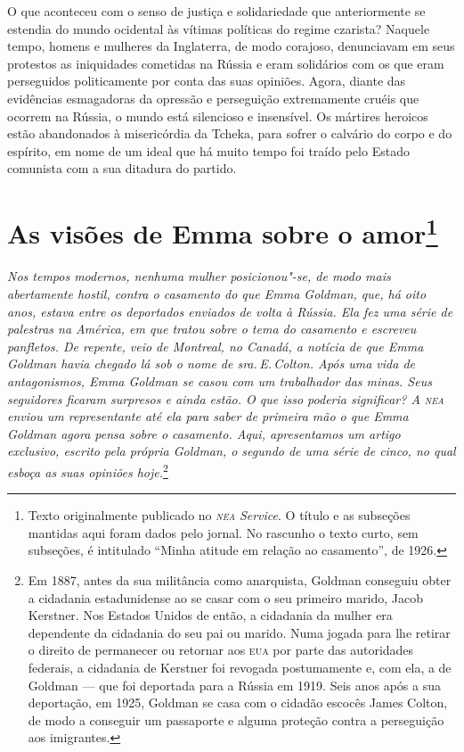 O que aconteceu com o senso de justiça e solidariedade que
anteriormente se estendia do mundo ocidental às vítimas políticas do
regime czarista? Naquele tempo, homens e mulheres da Inglaterra, de modo
corajoso, denunciavam em seus protestos as iniquidades cometidas na
Rússia e eram solidários com os que eram perseguidos politicamente por
conta das suas opiniões. Agora, diante das evidências esmagadoras da
opressão e perseguição extremamente cruéis que ocorrem na Rússia, o
mundo está silencioso e insensível. Os mártires heroicos estão
abandonados à misericórdia da Tcheka, para sofrer o calvário do corpo e
do espírito, em nome de um ideal que há muito tempo foi traído pelo
Estado comunista com a sua ditadura do partido.

\chapter{As visões de Emma sobre o amor\footnote{Texto originalmente publicado no
  \textit{\textsc{nea} Service}. O título e as subseções mantidas
  aqui foram dados pelo jornal. No rascunho o texto curto, sem
  subseções, é intitulado ``Minha atitude em relação ao casamento'', de 1926.}}


\textit{Nos tempos modernos, nenhuma mulher posicionou"-se, de
modo mais abertamente hostil, contra o casamento do que Emma Goldman,
que, há oito anos, estava entre os deportados enviados de volta à
Rússia. Ela fez uma série de palestras na América, em que tratou sobre o
tema do casamento e escreveu panfletos. De repente, veio de Montreal, no Canadá, a notícia de que Emma Goldman havia chegado lá sob o nome de
sra.\,E.\,Colton. Após uma vida de antagonismos, Emma Goldman se casou com
um trabalhador das minas. Seus seguidores ficaram surpresos e ainda
estão. O que isso poderia significar? A \textit{\textsc{nea}} enviou um representante até
ela para saber de primeira mão o que Emma Goldman agora pensa sobre o
casamento. Aqui, apresentamos um artigo exclusivo, escrito pela própria
Goldman, o segundo de uma série de cinco, no qual esboça as suas opiniões
hoje.}\footnote{Em 1887, antes da sua militância como anarquista, Goldman
  conseguiu obter a cidadania estadunidense ao se casar com o seu
  primeiro marido, Jacob Kerstner. Nos Estados Unidos de então, a
  cidadania da mulher era dependente da cidadania do seu pai ou marido.
  Numa jogada para lhe retirar o direito de permanecer ou retornar aos \textsc{eua}
  por parte das autoridades federais, a cidadania de Kerstner foi revogada
  postumamente e, com ela, a de Goldman --- que foi deportada para a
  Rússia em 1919. Seis anos após a sua deportação, em 1925, Goldman se
  casa com o cidadão escocês James Colton, de modo a conseguir um
  passaporte e alguma proteção contra a perseguição aos imigrantes.}

